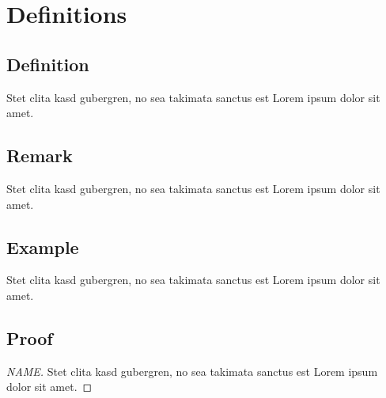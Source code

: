 \chapter{Definitions}
\label{ch:definitions}

\section{Definition}
\begin{definition}[NAME]
	Stet clita kasd gubergren, no sea takimata sanctus est Lorem ipsum dolor sit amet.
\end{definition}

\section{Remark}
\begin{note}[NAME]
	Stet clita kasd gubergren, no sea takimata sanctus est Lorem ipsum dolor sit amet.
\end{note}

\section{Example}
\begin{example}[NAME]
	Stet clita kasd gubergren, no sea takimata sanctus est Lorem ipsum dolor sit amet.
\end{example}

\section{Proof}
\begin{proof}[NAME]
	Stet clita kasd gubergren, no sea takimata sanctus est Lorem ipsum dolor sit amet.
\end{proof}